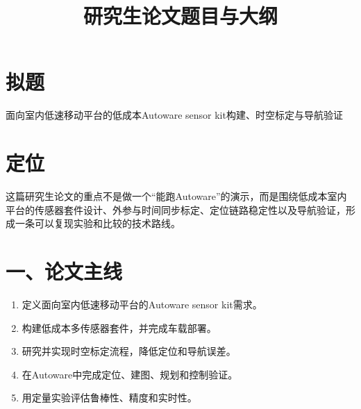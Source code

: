 \documentclass[UTF8,a4paper,11pt]{ctexart}
\title{研究生论文题目与大纲}
\author{}
\date{}
\begin{document}
\maketitle

\section*{拟题}
面向室内低速移动平台的低成本Autoware sensor kit构建、时空标定与导航验证

\section*{定位}
这篇研究生论文的重点不是做一个“能跑Autoware”的演示，而是围绕低成本室内平台的传感器套件设计、外参与时间同步标定、定位链路稳定性以及导航验证，形成一条可以复现实验和比较的技术路线。

\section*{一、论文主线}
\begin{enumerate}
  \item 定义面向室内低速移动平台的Autoware sensor kit需求。
  \item 构建低成本多传感器套件，并完成车载部署。
  \item 研究并实现时空标定流程，降低定位和导航误差。
  \item 在Autoware中完成定位、建图、规划和控制验证。
  \item 用定量实验评估鲁棒性、精度和实时性。
\end{enumerate}
\end{document}
